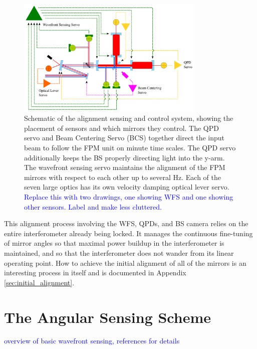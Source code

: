 \begin{figure} \begin{centering} \includegraphics[width=0.8\textwidth]{figures/ASClayout_wctrl.pdf} 
\caption[Schematic of the alignment sensing and control system]{Schematic of the alignment sensing and control system, showing the placement of sensors and which mirrors they control. The QPD servo and Beam Centering Servo (BCS) together direct the input beam to follow the FPM unit on minute time scales. The QPD servo additionally keeps the BS properly directing light into the y-arm. The wavefront sensing servo maintains the alignment of the FPM mirrors with respect to each other up to several Hz. Each of the seven large optics has its own velocity damping optical lever servo. \textcolor{blue}{Replace this with two drawings, one showing WFS and one showing other sensors. Label and make less cluttered.}}
\label{fig:ASClayout}
\end{centering}
\end{figure}

This alignment process involving the WFS, QPDs, and BS camera relies on the entire interferometer already being locked. It manages the continuous fine-tuning of mirror angles so that maximal power buildup in the interferometer is maintained, and so that the interferometer does not wander from its linear operating point. How to achieve the initial alignment of all of the mirrors is an interesting process in itself and is documented in Appendix \ref{sec:initial_alignment}.




\section{The Angular Sensing Scheme}
\textcolor{blue}{overview of basic wavefront sensing, references for details}




